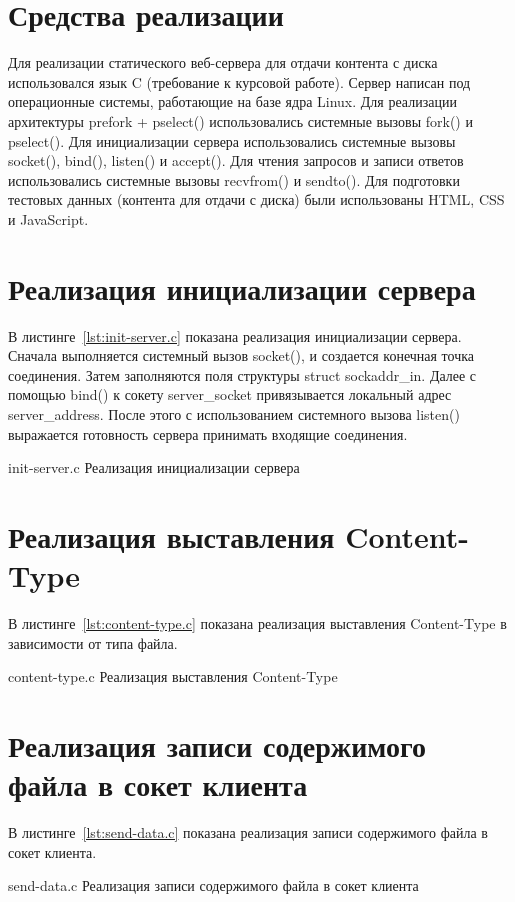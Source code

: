 \documentclass{bmstu}
\begin{document}
\section{Средства реализации}

Для реализации статического веб-сервера для отдачи контента с диска использовался язык C (требование к курсовой работе). 
Сервер написан под операционные системы, работающие на базе ядра Linux. 
Для реализации архитектуры prefork + pselect() использовались системные вызовы fork() и pselect(). 
Для инициализации сервера использовались системные вызовы socket(), bind(), listen() и accept(). 
Для чтения запросов и записи ответов использовались системные вызовы recvfrom() и sendto().
Для подготовки тестовых данных (контента для отдачи с диска) были использованы HTML, CSS и JavaScript.

\section{Реализация инициализации сервера}

В листинге~\ref{lst:init-server.c} показана реализация инициализации сервера. 
Сначала выполняется системный вызов socket(), и создается конечная точка соединения. 
Затем заполняются поля структуры struct sockaddr\_in. 
Далее с помощью bind() к сокету server\_socket привязывается локальный адрес server\_address. 
После этого с использованием системного вызова listen() выражается готовность сервера принимать входящие соединения.

	{init-server.c}
	{Реализация инициализации сервера}

\section{Реализация выставления Content-Type}

В листинге~\ref{lst:content-type.c} показана реализация выставления Content-Type в зависимости от типа файла.

	{content-type.c}
	{Реализация выставления Content-Type}
	
\section{Реализация записи содержимого файла в сокет клиента}

В листинге~\ref{lst:send-data.c} показана реализация записи содержимого файла в сокет клиента.

	{send-data.c}
	{Реализация записи содержимого файла в сокет клиента}
\end{document}
